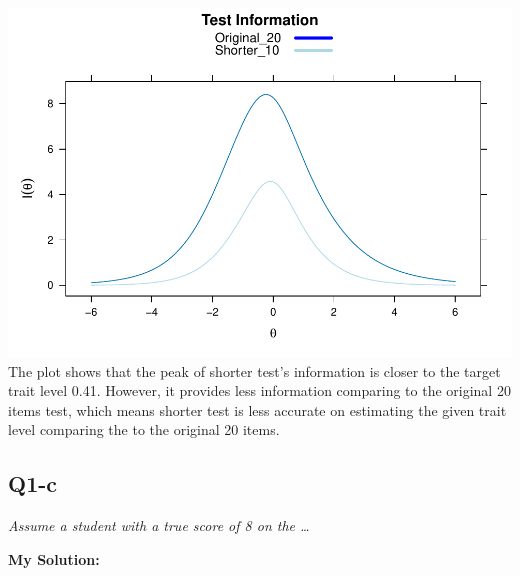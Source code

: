 \documentclass[
]{article}
\begin{document}
\includegraphics{Assignment_4_files/figure-latex/unnamed-chunk-15-1.pdf}
The plot shows that the peak of shorter test's information is closer to
the target trait level 0.41. However, it provides less information
comparing to the original 20 items test, which means shorter test is
less accurate on estimating the given trait level comparing the to the
original 20 items.

\hypertarget{q1-c}{%
\subsection{Q1-c}\label{q1-c}}

\emph{Assume a student with a true score of 8 on the \ldots{}}

\textbf{My Solution:}
\end{document}

